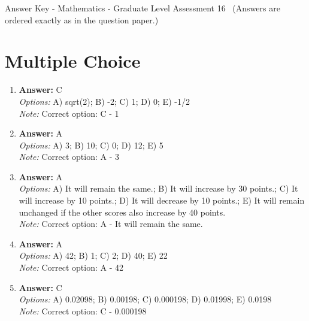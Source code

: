 \documentclass[12pt]{article}
\begin{document}
\begin{center}
Answer Key - Mathematics - Graduate Level Assessment 16 \
\small (Answers are ordered exactly as in the question paper.)
\end{center}

\section*{Multiple Choice}
\begin{enumerate}[label=\arabic*.]
\item \textbf{Answer:} C
\\ \textit{Options:} A) sqrt(2); B) -2; C) 1; D) 0; E) -1/2
\\ \textit{Note:} Correct option: C - 1
\item \textbf{Answer:} A
\\ \textit{Options:} A) 3; B) 10; C) 0; D) 12; E) 5
\\ \textit{Note:} Correct option: A - 3
\item \textbf{Answer:} A
\\ \textit{Options:} A) It will remain the same.; B) It will increase by 30 points.; C) It will increase by 10 points.; D) It will decrease by 10 points.; E) It will remain unchanged if the other scores also increase by 40 points.
\\ \textit{Note:} Correct option: A - It will remain the same.
\item \textbf{Answer:} A
\\ \textit{Options:} A) 42; B) 1; C) 2; D) 40; E) 22
\\ \textit{Note:} Correct option: A - 42
\item \textbf{Answer:} C
\\ \textit{Options:} A) 0.02098; B) 0.00198; C) 0.000198; D) 0.01998; E) 0.0198
\\ \textit{Note:} Correct option: C - 0.000198
\end{enumerate}
\end{document}
